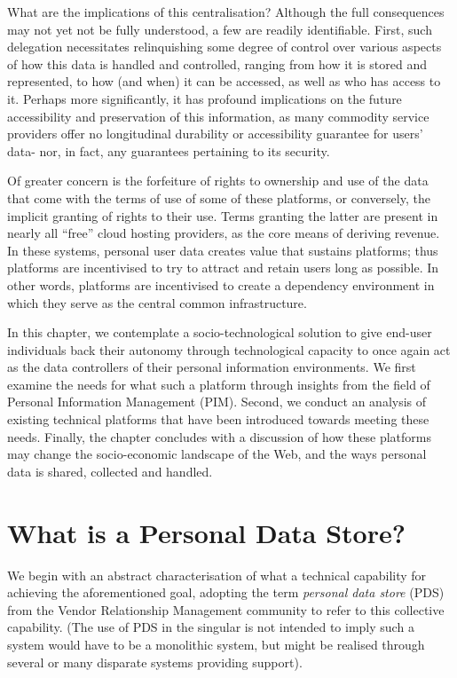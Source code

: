 \documentclass[runningheads,a4paper]{llncs}
\begin{document}
What are the implications of this centralisation?  Although the full consequences may not yet not be fully understood, a few are readily identifiable.  First, such delegation necessitates relinquishing some degree of control over various aspects of how this data is handled and controlled, ranging from how it is stored and represented, to how (and when) it can be accessed, as well as who has access to it.  Perhaps more significantly, it has profound implications on the future accessibility and preservation of this information, as many commodity service providers offer no longitudinal durability or accessibility guarantee for users' data- nor, in fact, any guarantees pertaining to its security.

Of greater concern is the forfeiture of rights to ownership and use of the data that come with the terms of use of some of these platforms, or conversely, the implicit granting of rights to their use. Terms granting the latter are present in nearly all ``free'' cloud hosting providers, as the core means of deriving revenue. In these systems, personal user data creates value that sustains platforms; thus platforms are incentivised to try to attract and retain users long as possible.  In other words, platforms are incentivised to create a dependency environment in which they serve as the central common infrastructure.

In this chapter, we contemplate a socio-technological solution to give end-user individuals back their autonomy through technological capacity to once again act as the data controllers of their personal information environments.  We first examine the needs for what such a platform through insights from the field of Personal Information Management (PIM).  Second, we conduct an analysis of existing technical platforms  that have been introduced towards meeting these needs.  Finally, the chapter concludes with a discussion of how these platforms may change the socio-economic landscape of the Web, and the ways personal data is shared, collected and handled.

\section{What is a Personal Data Store?}

We begin with an abstract characterisation of what a technical capability for achieving the aforementioned goal, adopting the term  \emph{personal data store} (PDS) from the Vendor Relationship Management community \cite{vrm} to refer to this collective capability. (The use of PDS in the singular is not intended to imply such a system would have to be a monolithic system, but might be realised through several or many disparate systems providing support).
\end{document}
